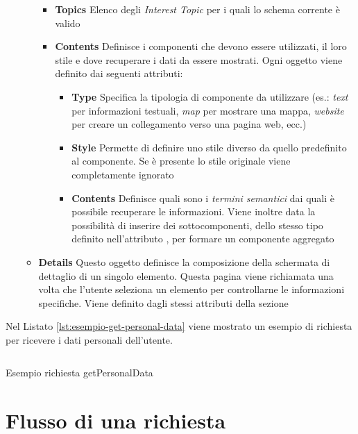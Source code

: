 \begin{itemize}
\begin{itemize}
		\begin{itemize}
			\item \textbf{Topics} Elenco degli \emph{Interest Topic} per i quali lo schema corrente è valido
			\item \textbf{Contents} Definisce i componenti che devono essere utilizzati, il loro stile e dove recuperare i dati da essere mostrati. Ogni oggetto viene definito dai seguenti attributi:
			\begin{itemize}
				\item \textbf{Type} Specifica la tipologia di componente da utilizzare (es.: \emph{text} per informazioni testuali, \emph{map} per mostrare una mappa, \emph{website} per creare un collegamento verso una pagina web, ecc.)
				\item \textbf{Style} Permette di definire uno stile diverso da quello predefinito al componente. Se è presente lo stile originale viene completamente ignorato
				\item \textbf{Contents} Definisce quali sono i \emph{termini semantici} dai quali è possibile recuperare le informazioni. Viene inoltre data la possibilità di inserire dei sottocomponenti, dello stesso tipo definito nell'attributo , per formare un componente aggregato
			\end{itemize}
		\end{itemize}	
		\item \textbf{Details} Questo oggetto definisce la composizione della schermata di dettaglio di un singolo elemento. Questa pagina viene richiamata una volta che l'utente seleziona un elemento per controllarne le informazioni specifiche. Viene definito dagli stessi attributi della sezione 			
	\end{itemize}
\end{itemize}

Nel Listato \ref{lst:esempio-get-personal-data} viene mostrato un esempio di richiesta per ricevere i dati personali dell'utente.

\begin{listing}[H]
	\inputminted{text}{5-implementazione-backend/Codice/esempio_get_personal_data.graphql}
	\caption{Esempio richiesta getPersonalData}
	\label{lst:esempio-get-personal-data}
\end{listing}

\section{Flusso di una richiesta\label{sec:flusso-richiesta-server}}

